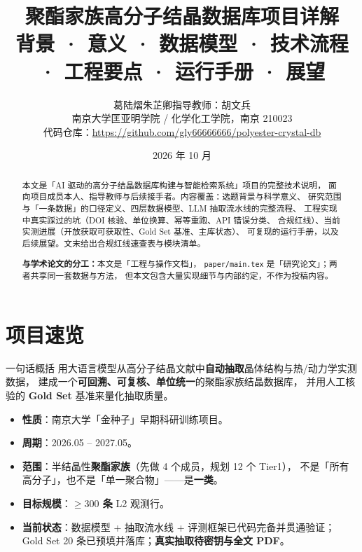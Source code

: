 \documentclass[11pt,a4paper]{ctexart}
\title{\textbf{聚酯家族高分子结晶数据库项目详解}\\[6pt]
{\large 背景 · 意义 · 数据模型 · 技术流程 · 工程要点 · 运行手册 · 展望}}
\author{葛陆熠\quad 朱芷卿\quad 指导教师：胡文兵\\[4pt]
{\small 南京大学匡亚明学院 / 化学化工学院，南京 210023}\\[2pt]
{\small 代码仓库：\url{https://github.com/gly66666666/polyester-crystal-db}}}
\date{2026 年 10 月}
\begin{document}
\maketitle

\begin{abstract}
\noindent
本文是「AI 驱动的高分子结晶数据库构建与智能检索系统」项目的完整技术说明，
面向项目成员本人、指导教师与后续接手者。内容覆盖：选题背景与科学意义、
研究范围与「一条数据」的口径定义、四层数据模型、LLM 抽取流水线的完整流程、
工程实现中真实踩过的坑（DOI 核验、单位换算、幂等重跑、API 错误分类、
合规红线）、当前实测进展（开放获取可获取性、Gold Set 基准、主库状态）、
可复现的运行手册，以及后续展望。文末给出合规红线速查表与模块清单。

\textbf{与学术论文的分工：}本文是「工程与操作文档」，
\texttt{paper/main.tex} 是「研究论文」；两者共享同一套数据与方法，
但本文包含大量实现细节与内部约定，不作为投稿内容。
\end{abstract}

\tableofcontents
\newpage

\section{项目速览}

\begin{tipbox}{一句话概括}
用大语言模型从高分子结晶文献中\textbf{自动抽取}晶体结构与热/动力学实测数据，
建成一个\textbf{可回溯、可复核、单位统一}的聚酯家族结晶数据库，
并用人工核验的 \textbf{Gold Set} 基准来量化抽取质量。
\end{tipbox}

\begin{itemize}[leftmargin=1.2em]
  \item \textbf{性质}：南京大学「金种子」早期科研训练项目。
  \item \textbf{周期}：2026.05 -- 2027.05。
  \item \textbf{范围}：半结晶性\textbf{聚酯家族}（先做 4 个成员，规划 12 个 Tier1），
        不是「所有高分子」，也不是「单一聚合物」——是\textbf{一类}。
  \item \textbf{目标规模}：\textbf{$\ge 300$ 条} L2 观测行。
  \item \textbf{当前状态}：数据模型 + 抽取流水线 + 评测框架已代码完备并贯通验证；
        Gold Set 20 条已预填并落库；\textbf{真实抽取待密钥与全文 PDF}。
\end{itemize}
\end{document}
